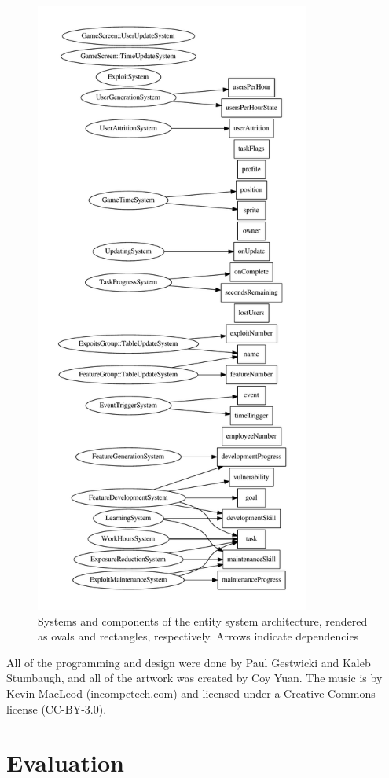 \documentclass[letterpaper]{article}
\begin{document}
\begin{figure}
\centering
\includegraphics[height=8in]{sys-dep.pdf}
\caption{Systems and components of the entity system architecture, rendered as ovals and rectangles, respectively. Arrows indicate dependencies}
\label{fig:sys-dep}
\end{figure}

All of the programming and design were done by Paul Gestwicki and
Kaleb Stumbaugh, and all of the artwork was created by Coy Yuan.  The
music is by Kevin MacLeod (\url{incompetech.com}) and licensed under a
Creative Commons license (CC-BY-3.0).


\section{Evaluation}
\label{sec:evaluation}
\end{document}

